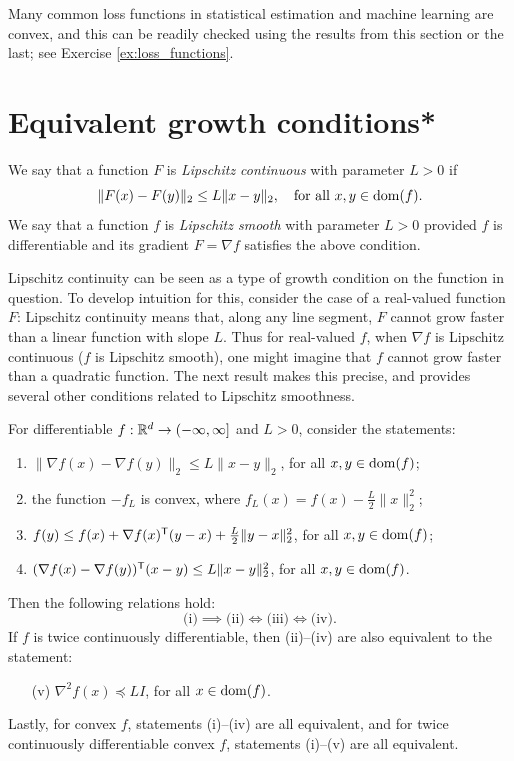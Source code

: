 Many common loss functions in statistical estimation and machine learning are
convex, and this can be readily checked using the results from this section or
the last; see Exercise \ref{ex:loss_functions}.             

\section{Equivalent growth conditions*}

We say that a function $F$ is \emph{Lipschitz continuous} with parameter $L>0$
if 
\[
\|F(x) - F(y)\|_2 \leq L \|x-y\|_2, \quad \text{for all $x,y \in
  \operatorname{dom}(f)$}. 
\]
We say that a function $f$ is \emph{Lipschitz smooth} with parameter $L>0$
provided $f$ is differentiable and its gradient $F=\nabla f$ satisfies the above
condition. 

Lipschitz continuity can be seen as a type of growth condition on the function
in question. To develop intuition for this, consider the case of a real-valued
function $F$: Lipschitz continuity means that, along any line segment, $F$
cannot grow faster than a linear function with slope $L$. Thus for real-valued $f$,
when $\nabla f$ is Lipschitz continuous ($f$ is Lipschitz smooth), one might
imagine that $f$ cannot grow faster than a quadratic function. The next
result makes this precise, and provides several other conditions related to
Lipschitz smoothness.

\begin{Theorem}
\label{thm:lipschitz_smoothness}
For differentiable $f : \mathbb{R}^d \to (-\infty, \infty]$ and $L>0$, consider the
statements:  
\begin{enumerate}[label=(\roman*)]
\item $\|\nabla f(x) - \nabla f(y)\|_2 \leq L \|x-y\|_2$, for all $x,y \in
  \operatorname{dom}(f)$; 
\item the function $-f_L$ is convex, where $f_L(x) = f(x) - \frac{L}{2}
  \|x\|_2^2$;   
\item $f(y) \leq f(x) + \nabla f(x)^{\mathsf{T}} (y-x) + \frac{L}{2} \|y-x\|_2^2$, for all
  $x,y \in \operatorname{dom}(f)$;
\item $(\nabla f(x) - \nabla f(y))^{\mathsf{T}} (x - y) \leq L\|x-y\|_2^2$, for all $x,y
  \in \operatorname{dom}(f)$.
\end{enumerate}
Then the following relations hold: 
\[
\text{(i)} \implies \text{(ii)} \iff \text{(iii)} \iff \text{(iv)}. 
\]
If $f$ is twice continuously differentiable, then (ii)--(iv) are also equivalent
to the statement: 
\begin{enumerate}
\item[(v)] $\nabla^2 f(x) \preceq LI$, for all $x \in \operatorname{dom}(f)$.
\end{enumerate} 
Lastly, for convex $f$, statements (i)--(iv) are all equivalent, and for twice  
continuously differentiable convex $f$, statements (i)--(v) are all equivalent. 
\end{Theorem}

